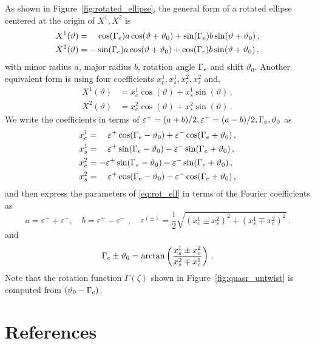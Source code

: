 \documentclass[12pt]{iopart}
\newcommand\hladdedrev[1]{#1} %
\newcommand\epsp{\varepsilon^{+}}
\newcommand\epsm{\varepsilon^{-}}
\newcommand{\thet}{\vartheta}
\begin{document}
 \hladdedrev{As shown in Figure~\ref{fig:rotated_ellipse}, the general form of a rotated ellipse centered at the origin of $X^1,X^2$ is  
\begin{equation}
    \begin{aligned}
    X^1(\thet) &= \quad \cos(\rotangle) a \cos(\thet+\thet_0)+ \sin(\rotangle) b \sin(\thet+\thet_0)\,, \\
     X^2(\thet)&= -\sin(\rotangle) a \cos(\thet+\thet_0)+ \cos(\rotangle) b \sin(\thet+\thet_0)\,,
    \end{aligned}\label{eq:rot_ell}
\end{equation}
with minor radius $a$, major radius $b$, rotation angle ${\Gamma_e}$ and shift $\thet_0$. Another equivalent form is using four coefficients $x^1_c,x^1_s,x^2_c,x^2_s$ and,
\begin{equation}
    \begin{aligned}
     X^1(\thet)&= x^1_c\cos(\thet)+ x^1_s\sin(\thet)\,, \\
     X^2(\thet)&= x^2_c\cos(\thet)+ x^2_s\sin(\thet)\,.
    \end{aligned}
\end{equation}
We write the coefficients in terms of $\epsp=(a+b)/2,\epsm=(a-b)/2,\rotangle,\thet_0$ as
\begin{equation}
    \begin{aligned}
        x^1_c&=\quad \epsp\cos(\rotangle-\thet_0)+\epsm\cos(\rotangle+\thet_0)\,, \\
        x^1_s&=\quad \epsp\sin(\rotangle-\thet_0)-\epsm\sin(\rotangle+\thet_0)\,,\\
        x^2_c&=-\epsp\sin(\rotangle-\thet_0)-\epsm\sin(\rotangle+\thet_0)\,,\\
        x^2_s&= \quad\epsp\cos(\rotangle-\thet_0)-\epsm\cos(\rotangle+\thet_0)\,,
    \end{aligned}
\end{equation}
and then express the parameters of \eqref{eq:rot_ell} in terms of the Fourier coefficients as
\begin{equation}
    a=\epsp+\epsm,\quad b=\epsp-\epsm\, \,,\quad  \varepsilon^{(\pm)}=\frac{1}{2}\sqrt{(x^1_c\pm x^2_s)^2+(x^1_s \mp x^2_c)^2}
 \,.
\end{equation}
and 
\begin{equation}
    \rotangle\pm\thet_0 = \arctan\left(\frac{x^1_s\pm x^2_c}{x^2_s \mp x^1_c} \right)\,. \label{eq:rot_ell_Gamma_pm_thet0}
\end{equation}
Note that the rotation function $\Gamma(\zeta)$ shown in Figure~\ref{fig:quasr_untwist} is computed from $(\thet_0-\rotangle)$.
 }%
\section*{References}


\end{document}
